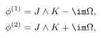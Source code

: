 \begin{equation}
\begin{aligned}
   \phi^{(1)} = J \wedge K - \im\Omega , \\
   \phi^{(2)} = J \wedge K + \im\Omega , \\
\end{aligned}
\end{equation}

